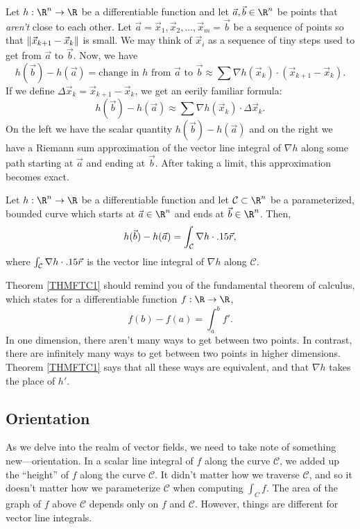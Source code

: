 Let $h:\R^n\to\R$ be a differentiable function and let $\vec a,\vec b\in\R^n$
be points that \emph{aren't} close to each other.  Let $\vec a=\vec x_1,\vec x_2,\ldots,\vec
x_m=\vec b$ be a sequence of points so that $\lVert\vec x_{k+1}-\vec x_k\rVert$ is small.
We may think of $\vec x_i$ as a sequence of tiny steps used to get from $\vec a$ to
$\vec b$.  Now, we have
\[
	h(\vec b)-h(\vec a)=\text{change in }h\text{ from }\vec a\text{ to }\vec b
	\approx 
	\sum \nabla h(\vec x_k)\cdot (\vec x_{k+1}-\vec x_k).
\]
If we define $\Delta \vec x_k=\vec x_{k+1}-\vec x_k$, we get an eerily familiar
formula:
\[
	h(\vec b)-h(\vec a)
	\approx 
	\sum \nabla h(\vec x_k)\cdot \Delta \vec x_k.
\]
On the left we have the scalar quantity $h(\vec b)-h(\vec a)$ and on the right
we have a Riemann sum approximation of the vector line integral
of $\nabla h$ along some path starting at $\vec a$ and ending at $\vec b$.  After
taking a limit, this approximation becomes exact.

\begin{theorem}
	\label{THMFTC1}
	Let $h:\R^n\to\R$ be a differentiable function and let
	$\mathcal C\subset \R^n$ be a parameterized, bounded curve 
	which starts at $\vec a\in\R^n$ and ends at $\vec b\in\R^n$.
	Then,
	\[
		h(\vec b)-h(\vec a) = \int_{\mathcal C} \nabla h\cdot .15\vec r,
	\]
	where $\int_{\mathcal C} \nabla h\cdot .15\vec r$ is the vector line
	integral of $\nabla h$ along $\mathcal C$.
\end{theorem}

Theorem \ref{THMFTC1} should remind you of the fundamental theorem of calculus,
which states for a differentiable function $f:\R\to\R$, 
\[
	f(b)-f(a) = \int_a^b f'.
\]
In one dimension, there aren't many ways to get between two points.  In
contrast, there are infinitely many ways to get between two points
in higher dimensions.  Theorem \ref{THMFTC1} says that all these ways
are equivalent, and that $\nabla h$ takes the place of $h'$.

\subsection{Orientation}

As we delve into the realm of vector fields, we need to take note of something
new---orientation.  In a scalar line integral of $f$ along the curve
$\mathcal C$, we added up the ``height'' of $f$ along the curve $\mathcal C$.
It didn't matter how we traverse $\mathcal C$, and so it
doesn't matter how we parameterize $\mathcal C$ when computing $\int_C f$.  
The area of the graph of $f$ above
$\mathcal C$ depends only on $f$ and $\mathcal C$.  However, things are different for
vector line integrals.


